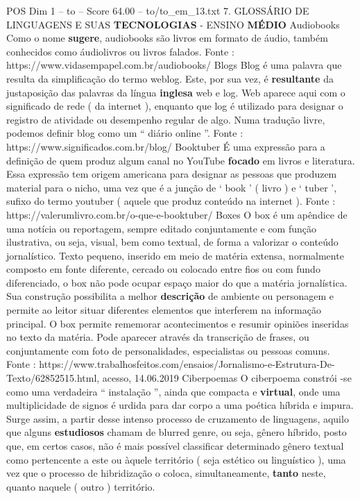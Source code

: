 \begin{textsample}{POS Dim 1 – to – Score 64.00 – to/to\_em\_13.txt}  \label{ex:f1_pos_252}
7.
GLOSSÁRIO DE LINGUAGENS E SUAS \textbf{TECNOLOGIAS} - ENSINO \textbf{MÉDIO} Audiobooks Como o nome \textbf{sugere}, audiobooks são livros em formato de áudio, também conhecidos como áudiolivros ou livros falados.
Fonte : https://www.vidasempapel.com.br/audiobooks/ Blogs Blog é uma palavra que resulta da simplificação do termo weblog.
Este, por sua vez, é \textbf{resultante} da justaposição das palavras da língua \textbf{inglesa} web e log.
Web aparece aqui com o significado de rede ( da internet ), enquanto que log é utilizado para designar o registro de atividade ou desempenho regular de algo.
Numa tradução livre, podemos definir blog como um “ diário online ”.
Fonte : https://www.significados.com.br/blog/ Booktuber É uma expressão para a definição de quem produz algum canal no YouTube \textbf{focado} em livros e literatura.
Essa expressão tem origem americana para designar as pessoas que produzem material para o nicho, uma vez que é a junção de ‘ book ’ ( livro ) e ‘ tuber ’, sufixo do termo youtuber ( aquele que produz conteúdo na internet ).
Fonte : https://valerumlivro.com.br/o-que-e-booktuber/ Boxes O box é um apêndice de uma notícia ou reportagem, sempre editado conjuntamente e com função ilustrativa, ou seja, visual, bem como textual, de forma a valorizar o conteúdo jornalístico.
Texto pequeno, inserido em meio de matéria extensa, normalmente composto em fonte diferente, cercado ou colocado entre fios ou com fundo diferenciado, o box não pode ocupar espaço maior do que a matéria jornalística.
Sua construção possibilita a melhor \textbf{descrição} de ambiente ou personagem e permite ao leitor situar diferentes elementos que interferem na informação principal.
O box permite rememorar acontecimentos e resumir opiniões inseridas no texto da matéria.
Pode aparecer através da transcrição de frases, ou conjuntamente com foto de personalidades, especialistas ou pessoas comuns.
Fonte : https://www.trabalhosfeitos.com/ensaios/Jornalismo-e-Estrutura-De-Texto/62852515.html, acesso, 14.06.2019 Ciberpoemas O ciberpoema constrói -se como uma verdadeira “ instalação ”, ainda que compacta e \textbf{virtual}, onde uma multiplicidade de signos é urdida para dar corpo a uma poética híbrida e impura.
Surge assim, a partir desse intenso processo de cruzamento de linguagens, aquilo que alguns \textbf{estudiosos} chamam de blurred genre, ou seja, gênero híbrido, posto que, em certos casos, não é mais possível classificar determinado gênero textual como pertencente a este ou àquele território ( seja estético ou linguístico ), uma vez que o processo de hibridização o coloca, simultaneamente, \textbf{tanto} neste, quanto naquele ( outro ) território.

\end{textsample}
